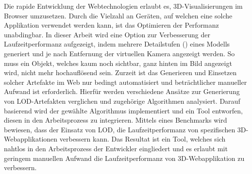 Die rapide Entwicklung der Webtechnologien erlaubt es, 3D-Visualisierungen im Browser umzusetzen. Durch die Vielzahl an Geräten, auf welchen eine solche Applikation verwendet werden kann, ist das Optimieren der Performanz unabdingbar. In dieser Arbeit wird eine Option zur Verbesserung der Laufzeitperformanz aufgezeigt, indem mehrere Detailstufen () eines Modells generiert und je nach Entfernung der virtuellen Kamera angezeigt werden. So muss ein Objekt, welches kaum noch sichtbar, ganz hinten im Bild angezeigt wird, nicht mehr hochauflösend sein.
Zurzeit ist das Generieren und Einsetzen solcher Artefakte im Web nur bedingt automatisiert und beträchtlicher manueller Aufwand ist erforderlich.
\bigbreak
Hierfür werden verschiedene Ansätze zur Generierung von LOD-Artefakten verglichen und zugehörige Algorithmen analysiert.
Darauf basierend wird der gewählte Algorithmus implementiert und ein Tool entworfen, diesen in den Arbeitsprozess zu integrieren.
Mittels eines Benchmarks wird bewiesen, dass der Einsatz von LOD, die Laufzeitperformanz von spezifischen 3D-Webapplikationen verbessern kann.
\bigbreak
Das Resultat ist ein Tool, welches sich nahtlos in den Arbeitsprozess der Entwickler eingliedert und es erlaubt mit geringem manuellen Aufwand die Laufzeitperformanz von 3D-Webapplikation zu verbessern.
